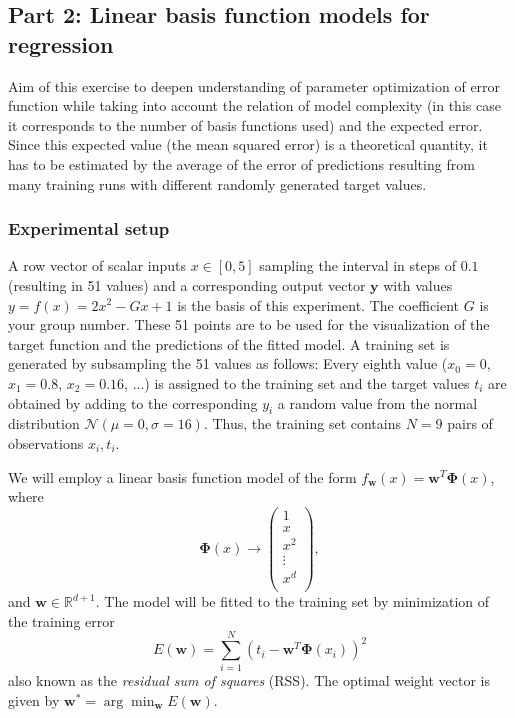 \documentclass[a4]{article}
\begin{document}
\subsection{Part 2: Linear basis function models for regression}

Aim of this exercise to deepen understanding of parameter optimization of error function while taking into account the relation of model complexity (in this case it corresponds to the number of basis functions used) and the expected error. Since this expected value (the mean squared error) is a theoretical quantity, it has to be estimated by the average of the error of predictions resulting from many training runs with different randomly generated target values.

\subsubsection{Experimental setup}
A row vector of scalar inputs $x \in [0,5]$ sampling the interval in steps of $0.1$ (resulting in 51 values) and a corresponding output vector $\mathbf{y}$ with values $y = f(x) = 2x^2-Gx+1$ is the basis of this experiment. The coefficient $G$ is your group number. These 51 points are to be used for the visualization of the target function and the predictions of the fitted model.
A training set is generated by subsampling the 51 values as follows: Every eighth value ($x_0 = 0$, $x_1 = 0.8$, $x_2 = 0.16$, ...) is assigned to the training set and the target values $t_i$ are obtained by adding to the corresponding $y_i$ a random value from the normal distribution $\mathcal{N}(\mu = 0,\sigma = 16)$. Thus, the training set contains $N = 9$ pairs of observations $x_i, t_i$. 

We will employ a linear basis function model of the form $f_{\mathbf w}(x) = {\mathbf w}^T{\mathbf \Phi}(x)$, where\begin{equation} \nonumber
{\mathbf \Phi}(x) \rightarrow \left(
\begin{array}{c} 1\\ x \\ x^2 \\ \vdots \\ x^d \\ \end{array}\right),
\end{equation} 
and ${\mathbf w} \in \mathbb{R}^{d+1}$. The model will be fitted to the training set by minimization of the training error 
\begin{equation}
E({\mathbf w}) = \sum_{i = 1}^N(t_i - {\mathbf w}^T{\mathbf \Phi}(x_i))^2
\end{equation} 
also known as the \emph{residual sum of squares} (RSS). The optimal weight vector is given by ${\mathbf w}^* = \arg\min_{\mathbf w} E({\mathbf w})$.
\end{document}
